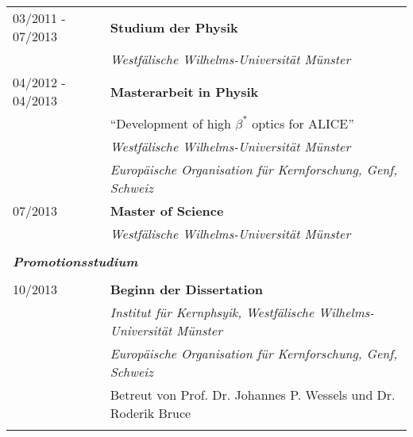 \begin{table}[h]
\begin{tabular}{ll}
 03/2011 - 07/2013 & \textbf{Studium der Physik}\\
 &  \textit{Westf\"{a}lische Wilhelms-Universit\"{a}t M\"{u}nster}  \\
 04/2012 - 04/2013 & \textbf{Masterarbeit in Physik}\\
  &  ``Development of high $\beta^*$ optics for ALICE''  \\
 &  \textit{Westf\"{a}lische Wilhelms-Universit\"{a}t M\"{u}nster}  \\
                    &\textit{Europ\"{a}ische Organisation f\"{u}r Kernforschung, Genf, Schweiz} \\ 
 \phantom{10/2007 - }07/2013 & \textbf{Master of Science}\\
 &  \textit{Westf\"{a}lische Wilhelms-Universit\"{a}t M\"{u}nster}  \\
 & \\
\multicolumn{2}{l}{\textit{\textbf{Promotionsstudium}}}\\
 & \\
10/2013           & \textbf{Beginn der Dissertation}    \\ 
                    &\textit{Institut f\"{u}r Kernphsyik, Westf\"{a}lische Wilhelms-Universit\"{a}t M\"{u}nster} \\ 
                    &\textit{Europ\"{a}ische Organisation f\"{u}r Kernforschung, Genf, Schweiz} \\ 
                    & Betreut von Prof. Dr. Johannes P. Wessels und Dr. Roderik Bruce    \\ 
 & \\
\end{tabular}
\end{table}


\mbox{}
\vfill













%






  





  
